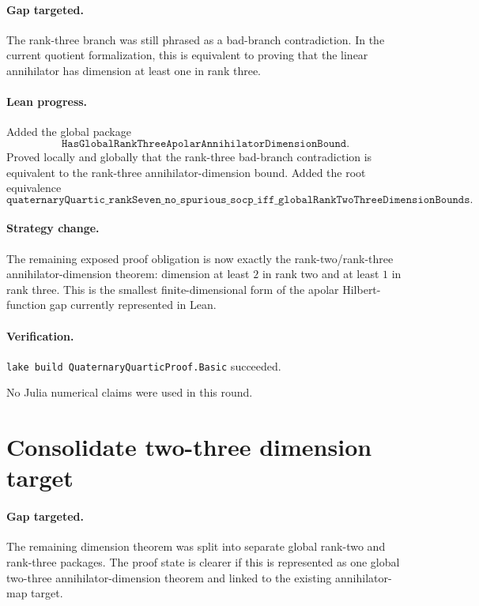 \documentclass[11pt]{article}
\begin{document}
\paragraph{Gap targeted.}
The rank-three branch was still phrased as a bad-branch contradiction.  In the
current quotient formalization, this is equivalent to proving that the
linear annihilator has dimension at least one in rank three.

\paragraph{Lean progress.}
Added the global package
\[
\texttt{HasGlobalRankThreeApolarAnnihilatorDimensionBound}.
\]
Proved locally and globally that the rank-three bad-branch contradiction is
equivalent to the rank-three annihilator-dimension bound.  Added the root
equivalence
\[
\texttt{quaternaryQuartic\_rankSeven\_no\_spurious\_socp\_iff\_globalRankTwoThreeDimensionBounds}.
\]

\paragraph{Strategy change.}
The remaining exposed proof obligation is now exactly the rank-two/rank-three
annihilator-dimension theorem: dimension at least \(2\) in rank two and at
least \(1\) in rank three.  This is the smallest finite-dimensional form of
the apolar Hilbert-function gap currently represented in Lean.

\paragraph{Verification.}
\texttt{lake build QuaternaryQuarticProof.Basic} succeeded.

No Julia numerical claims were used in this round.

\section*{Consolidate two-three dimension target}

\paragraph{Gap targeted.}
The remaining dimension theorem was split into separate global rank-two and
rank-three packages.  The proof state is clearer if this is represented as one
global two-three annihilator-dimension theorem and linked to the existing
annihilator-map target.
\end{document}
